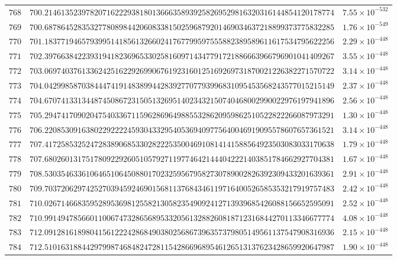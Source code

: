 \documentclass[12pt,reqno]{amsart}
\theoremstyle{remark}
\begin{document}
\begin{longtable}{clc}
$768$ & $700.2146135239782071622293818013666358939258269529816320316144854120178774$ & $7.55\times 10^{-532}$ \\
$769$ & $700.6878645283532778089844206083381502596879201469034637218899373775832285$ & $1.76\times 10^{-549}$ \\
$770$ & $701.1837719465793995141856132660241767799597555882389589611617534795622256$ & $2.29\times 10^{-448}$ \\
$771$ & $702.3976638422393194182369653302581609714347791721886663966796901041409267$ & $3.55\times 10^{-448}$ \\
$772$ & $703.0697403761336242516229269906761923160125169269731870021226382271570722$ & $3.14\times 10^{-448}$ \\
$773$ & $704.0429985870384447419148389944283927707793996831095453568243577015215149$ & $2.37\times 10^{-448}$ \\
$774$ & $704.6707413313448745086723150513269514023432150740468002990022976197941896$ & $2.56\times 10^{-448}$ \\
$775$ & $705.2947417090204754033671159628696498855328620959862510522822266087973291$ & $1.30\times 10^{-448}$ \\
$776$ & $706.2208530916380229222245930433295405369409775640046919095578607657361521$ & $3.14\times 10^{-448}$ \\
$777$ & $707.4172585325247283890685330282225350046910814141588564923503083033170638$ & $1.79\times 10^{-448}$ \\
$778$ & $707.6802601317517809229260510579271197746421444042221403851784662927704381$ & $1.67\times 10^{-448}$ \\
$779$ & $708.5303546336106465106450880170232595679582730789002826392309433201639361$ & $2.91\times 10^{-448}$ \\
$780$ & $709.7037206297425270394592469015681137684346119716400526585353217919757483$ & $2.42\times 10^{-448}$ \\
$781$ & $710.0267146683595289536981255821305823549092412713939685426088156652595091$ & $2.52\times 10^{-448}$ \\
$782$ & $710.9914947856601100674732865689533205613288260818712316844270113346677774$ & $4.08\times 10^{-448}$ \\
$783$ & $712.0912816189804156122242868490380256867396357379805149561137547908316936$ & $2.15\times 10^{-448}$ \\
$784$ & $712.5101631884429799874684824728115428669689546126513137623428659920647987$ & $1.90\times 10^{-448}$ \\

\end{longtable}
\end{document}
